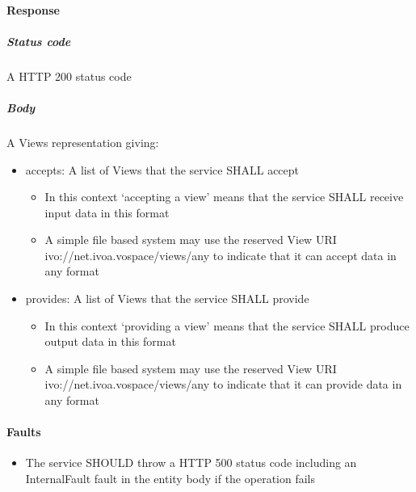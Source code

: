 \documentclass[11pt,a4paper]{ivoa}
\begin{document}
\paragraph{Response}
\subparagraph{Status code} A HTTP 200 status code
\subparagraph{Body}
A Views representation giving:
\begin{itemize}
    \item accepts: A list of Views that the service SHALL accept
    \begin{itemize}
        \item In this context `accepting a view' means that the service SHALL receive input data in this format
        \item A simple file based system may use the reserved View URI ivo://net.ivoa.vospace/views/any to indicate that it can accept data in any format
    \end{itemize}
    \item provides: A list of Views that the service SHALL provide
    \begin{itemize}
        \item In this context `providing a view' means that the service SHALL produce output data in this format
        \item A simple file based system may use the reserved View URI ivo://net.ivoa.vospace/views/any to indicate that it can provide data in any format
    \end{itemize}
\end{itemize}

\paragraph{Faults}
\begin{itemize}
    \item The service SHOULD throw a HTTP 500 status code including an InternalFault fault in the entity body if the operation fails
\end{itemize}
\end{document}
